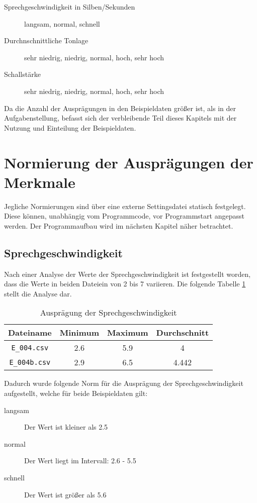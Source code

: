 \begin{description}
  \item [Sprechgeschwindigkeit in Silben/Sekunden] langsam, normal, schnell
  \item [Durchnschnittliche Tonlage] sehr niedrig, niedrig, normal, hoch, sehr hoch
  \item [Schallstärke] sehr niedrig, niedrig, normal, hoch, sehr hoch
\end{description}

Da die Anzahl der Ausprägungen in den Beispieldaten größer ist, als in der Aufgabenstellung, befasst sich der verbleibende Teil dieses Kapitels mit der Nutzung und Einteilung der Beispieldaten.

\section{Normierung der Ausprägungen der Merkmale}
Jegliche Normierungen sind über eine externe Settingsdatei statisch festgelegt. Diese können, unabhängig vom Programmcode, vor Programmstart angepasst werden. Der Programmaufbau wird im nächsten Kapitel näher betrachtet.

\subsection{Sprechgeschwindigkeit}
\label{sprechgeschwindigkeit_auspr}
Nach einer Analyse der Werte der Sprechgeschwindigkeit ist festgestellt worden, dass die Werte in beiden Dateiein von 2 bis 7 variieren. Die folgende Tabelle \ref{tab:sprechgeschwdingikeit} stellt die Analyse dar. 

\begin{table}[h]
\begin{tabular}{ c | c | c | c}
  Dateiname & Minimum & Maximum & Durchschnitt \\
  \hline 
  \verb|E_004.csv|  & 2.6 & 5.9 & 4 \\
  \verb|E_004b.csv| & 2.9 & 6.5 & 4.442 \\
\end{tabular}
\caption{Ausprägung der Sprechgeschwindigkeit}
\label{tab:sprechgeschwdingikeit}
\end{table}

Dadurch wurde folgende Norm für die Ausprägung der Sprechgeschwindigkeit aufgestellt, welche für beide Beispieldaten gilt:
\begin{description}
  \item [langsam] Der Wert ist kleiner als 2.5
  \item [normal] Der Wert liegt im Intervall: 2.6 - 5.5
  \item [schnell] Der Wert ist größer als 5.6
\end{description}


